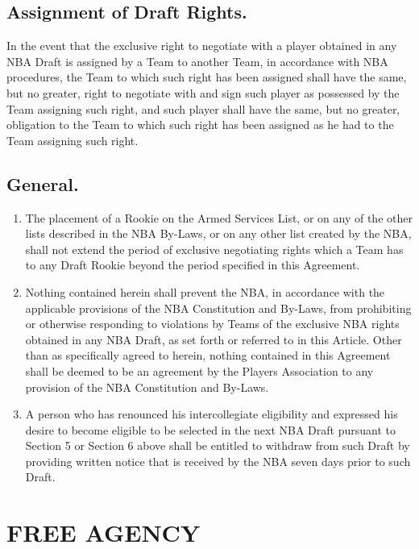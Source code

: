 \documentclass[
]{book}
\providecommand{\tightlist}{%
  \setlength{\itemsep}{0pt}\setlength{\parskip}{0pt}}
\begin{document}
\hypertarget{assignment-of-draft-rights.}{%
\section{Assignment of Draft Rights.}\label{assignment-of-draft-rights.}}

In the event that the exclusive right to negotiate with a player obtained in any NBA Draft is assigned by a Team to another Team, in accordance with NBA procedures, the Team to which such right has been assigned shall have the same, but no greater, right to negotiate with and sign such player as possessed by the Team assigning such right, and such player shall have the same, but no greater, obligation to the Team to which such right has been assigned as he had to the Team assigning such right.

\hypertarget{general.-1}{%
\section{General.}\label{general.-1}}

\begin{enumerate}
\def\labelenumi{(\alph{enumi})}
\tightlist
\item
  The placement of a Rookie on the Armed Services List, or on any of the other lists described in the NBA By-Laws, or on any other list created by the NBA, shall not extend the period of exclusive negotiating rights which a Team has to any Draft Rookie beyond the period specified in this Agreement.
\item
  Nothing contained herein shall prevent the NBA, in accordance with the applicable provisions of the NBA Constitution and By-Laws, from prohibiting or otherwise responding to violations by Teams of the exclusive NBA rights obtained in any NBA Draft, as set forth or referred to in this Article. Other than as specifically agreed to herein, nothing contained in this Agreement shall be deemed to be an agreement by the Players Association to any provision of the NBA Constitution and By-Laws.
\item
  A person who has renounced his intercollegiate eligibility and expressed his desire to become eligible to be selected in the next NBA Draft pursuant to Section 5 or Section 6 above shall be entitled to withdraw from such Draft by providing written notice that is received by the NBA seven days prior to such Draft.
\end{enumerate}

\hypertarget{free-agency}{%
\chapter{FREE AGENCY}\label{free-agency}}
\end{document}
